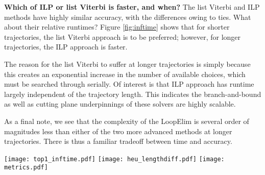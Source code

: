 \textbf{Which of ILP or list Viterbi is faster, and when?}
The list Viterbi and ILP methods have highly similar accuracy, with the differences owing to ties.
What about their relative runtimes?
Figure \ref{fig:inftime} shows that for shorter trajectories, the list Viterbi approach is to be preferred;
however, for longer trajectories, the ILP approach is faster.

The reason for the list Viterbi to suffer at longer trajectories is simply because this creates an exponential increase in the number of available choices, which must be searched through serially.
Of interest is that ILP approach has runtime largely independent of the trajectory length.
This indicates the branch-and-bound as well as cutting plane underpinnings of these solvers are highly scalable.

As a final note, we see that the complexity of the LoopElim is several order of magnitudes less than either of the two more advanced methods at longer trajectories.
There is thus a familiar tradeoff between time and accuracy.



\begin{figure*}[!t]
\begin{minipage}[c]{0.8\textwidth}
		\centering
		\texttt{[image: top1\_inftime.pdf]}
	    \label{fig:inftime}
		\quad
		\centering
		\texttt{[image: heu\_lengthdiff.pdf]}
	    \label{fig:length-christo}
		\quad
		\centering
		\texttt{[image: metrics.pdf]}
	    \label{fig:acc-vs-length}
\end{minipage}
\end{figure*}
